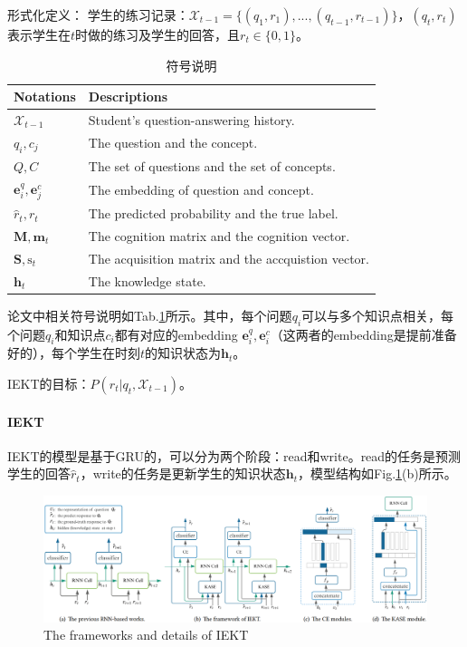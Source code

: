 形式化定义：
学生的练习记录：$\mathcal{X}_{t-1} = \{(q_1, r_1), ..., (q_{t-1}, r_{t-1})\}$，$(q_t, r_t)$表示学生在$t$时做的练习及学生的回答，且$r_t \in \{0, 1\}$。
\begin{table}[h]
	\centering
	\caption{符号说明}
	\label{tab:annotation}
	\begin{tabular}{ll}
		\hline Notations & Descriptions \\
		\hline$\mathcal{X}_{t-1}$ & Student's question-answering history. \\
		$q_{i}, c_{j}$ & The question and the concept. \\
		$Q, C$ & The set of questions and the set of concepts. \\
		$\mathbf{e}_{i}^{q}, \mathbf{e}_{j}^{c}$ & The embedding of question and concept. \\
		$\hat{r}_{t}, r_{t}$ & The predicted probability and the true label. \\
		$\mathbf{M}, \mathbf{m}_{t}$ & The cognition matrix and the cognition vector. \\
		$\mathbf{S}, \mathrm{s}_{t}$ & The acquisition matrix and the accquistion vector. \\
		$\mathbf{h}_{t}$ & The knowledge state. \\
		\hline
	\end{tabular}
\end{table}
论文中相关符号说明如Tab.\ref{tab:annotation}所示。其中，每个问题$q_i$可以与多个知识点相关，每个问题$q_i$和知识点$c_i$都有对应的embedding $\boldsymbol{e}_i^q, \boldsymbol{e}_i^c$（这两者的embedding是提前准备好的），每个学生在时刻$t$的知识状态为$\boldsymbol{h}_t$。

IEKT的目标：$P(r_t | q_t, \mathcal{X}_{t-1})$。

\paragraph{IEKT}
IEKT的模型是基于GRU的，可以分为两个阶段：read和write。read的任务是预测学生的回答$\hat{r}_t$，write的任务是更新学生的知识状态$\boldsymbol{h}_t$，模型结构如Fig.\ref{fig:iekt}(b)所示。
\begin{figure}[h]
	\centering
	\includegraphics[width=\textwidth]{pics/iekt.png}
	\caption{The frameworks and details of IEKT}
	\label{fig:iekt}
\end{figure}

